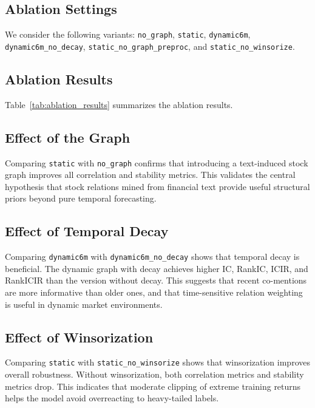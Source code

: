 \subsection{Ablation Settings}

We consider the following variants: \texttt{no\_graph}, \texttt{static}, \texttt{dynamic6m}, \texttt{dynamic6m\_no\_decay}, \texttt{static\_no\_graph\_preproc}, and \texttt{static\_no\_winsorize}.

\subsection{Ablation Results}

Table~\ref{tab:ablation_results} summarizes the ablation results.

\subsection{Effect of the Graph}

Comparing \texttt{static} with \texttt{no\_graph} confirms that introducing a text-induced stock graph improves all correlation and stability metrics. This validates the central hypothesis that stock relations mined from financial text provide useful structural priors beyond pure temporal forecasting.

\subsection{Effect of Temporal Decay}

Comparing \texttt{dynamic6m} with \texttt{dynamic6m\_no\_decay} shows that temporal decay is beneficial. The dynamic graph with decay achieves higher IC, RankIC, ICIR, and RankICIR than the version without decay. This suggests that recent co-mentions are more informative than older ones, and that time-sensitive relation weighting is useful in dynamic market environments.

\subsection{Effect of Winsorization}

Comparing \texttt{static} with \texttt{static\_no\_winsorize} shows that winsorization improves overall robustness. Without winsorization, both correlation metrics and stability metrics drop. This indicates that moderate clipping of extreme training returns helps the model avoid overreacting to heavy-tailed labels.

